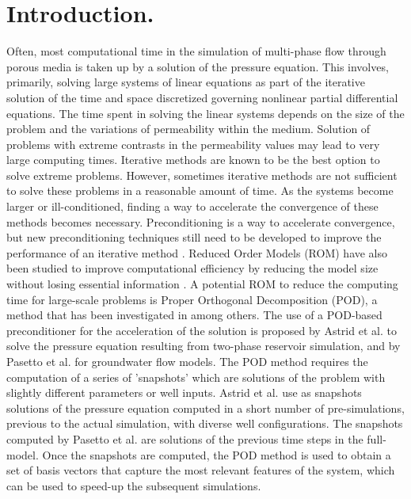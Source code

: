 \documentclass[12pt]{article}
\numberwithin{equation}{section}
\begin{document}
  \section{Introduction.}
  \hspace{0.5cm}Often, most computational time in the simulation of multi-phase flow through porous media is taken 
  up by a
solution of the pressure equation. This involves, primarily, solving large systems of linear equations as 
part of the iterative solution of the time and space discretized governing nonlinear partial differential 
equations. The time spent in solving the linear systems depends on the size of the problem and the 
variations of permeability within the medium. Solution of problems with extreme contrasts in the
permeability values may lead to very large computing times. 
Iterative methods are known to be the best option to solve extreme problems. However, sometimes iterative methods are not sufficient to solve these problems in a reasonable amount of time. As the systems become larger or ill-conditioned, finding a way to accelerate the convergence of these methods becomes necessary. Preconditioning is a way to accelerate convergence, but new preconditioning techniques still need to be developed to improve the performance of an iterative method \cite{Vuik02,Benzi02}.
Reduced Order Models (ROM) have also been studied to improve computational efficiency by reducing the model size without losing essential information \cite{Heijn04,Barone09,Kala14}. 
A potential ROM to reduce the computing time for large-scale problems is Proper Orthogonal 
Decomposition (POD), a method that has been investigated in \cite{Kunisch02,Doren06,Astrid11,Mark06,Pasetto16,Carlberg15} among others. 
The use of a POD-based preconditioner for the acceleration of the solution is proposed by Astrid et al.
\cite{Astrid11} to solve the pressure equation resulting from two-phase reservoir simulation, and by Pasetto 
et al. \cite{Pasetto16} for groundwater flow models. 
The POD method requires the computation of a series of 'snapshots' which are solutions of the problem with slightly 
different parameters or well inputs. Astrid et al. \cite{Astrid11} use as snapshots solutions of the pressure equation computed in a short number of pre-simulations, previous to the actual simulation, with diverse well configurations. The snapshots computed by Pasetto et al. \cite{Pasetto16} are solutions of the previous time steps in the full-model.
Once the snapshots are computed, the POD method is used to obtain a set of basis 
vectors that capture the most relevant features of the system, which can be used to speed-up the subsequent simulations.\\
\end{document}
